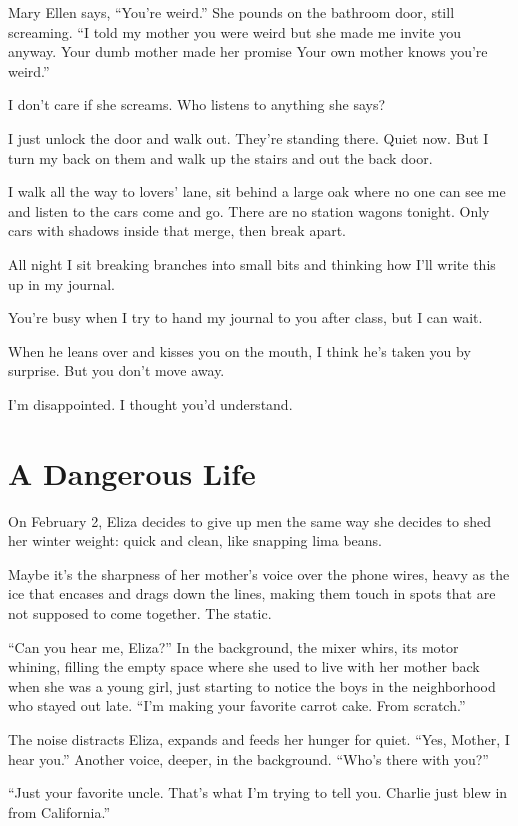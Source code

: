 \documentclass[twoside,10pt]{book}
\begin{document}
Mary Ellen says, ``You're weird.'' She pounds on the bathroom door,
still screaming. ``I told my mother you were weird but she made me
invite you anyway. Your dumb mother made her pro­mise Your own mother
knows you're weird.''

I don't care if she screams. Who listens to anything she says?

I just unlock the door and walk out. They're standing there. Quiet now.
But I turn my back on them and walk up the stairs and out the back door.

I walk all the way to lovers' lane, sit behind a large oak where no one
can see me and listen to the cars come and go. There are no station
wagons tonight. Only cars with shadows inside that merge, then break
apart.

All night I sit breaking branches into small bits and thinking how I'll
write this up in my journal.

You're busy when I try to hand my journal to you after class, but I can
wait.

When he leans over and kisses you on the mouth, I think he's taken you
by surprise. But you don't move away.

I'm disappointed. I thought you'd understand.



\cleardoublepage
\chapter{A Dangerous Life}

On February 2, Eliza decides to give up men the same way she decides to
shed her winter weight: quick and clean, like snapping lima beans.

Maybe it's the sharpness of her mother's voice over the phone wires,
heavy as the ice that encases and drags down the lines, making them
touch in spots that are not supposed to come together. The static.

``Can you hear me, Eliza?'' In the background, the mixer whirs, its
motor whining, filling the empty space where she used to live with her
mother back when she was a young girl, just starting to notice the boys
in the neighborhood who stayed out late. ``I'm making your favorite
carrot cake. From scratch.''

The noise distracts Eliza, expands and feeds her hunger for quiet.
``Yes, Mother, I hear you.'' Another voice, deeper, in the background.
``Who's there with you?''

``Just your favorite uncle. That's what I'm trying to tell you. Charlie
just blew in from California.''
\end{document}
